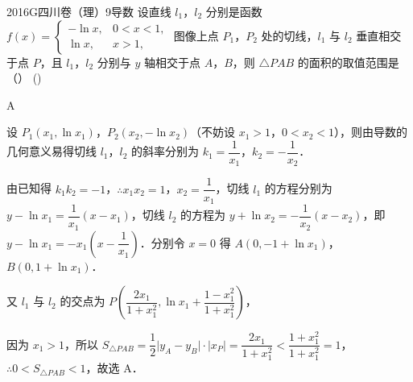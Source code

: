 
\begin{problem}{2016}{G}{四川卷（理）}{9}{导数}
设直线 $ l_1 $，$ l_2 $ 分别是函数 $ f(x)=\begin{cases} -\ln x, & 0<x<1, \\ \ln x, & x>1, \end{cases} $ 图像上点 $ P_1 $，$ P_2 $ 处的切线，$ l_1 $ 与 $ l_2 $ 垂直相交于点 $ P $，且 $ l_1 $，$ l_2 $ 分别与 $ y $ 轴相交于点 $ A $，$ B $，则 $ \triangle PAB $ 的面积的取值范围是 （\hspace{1cm}） (\hspace{1cm})
\begin{choices}
\end{choices}
\end{problem}

\begin{answer}
A
\end{answer}

\begin{solutions}
设 $ P_1(x_1,\ln x_1) $，$ P_2(x_2,-\ln x_2) $（不妨设 $ x_1>1 $，$ 0<x_2<1 $），则由导数的几何意义易得切线 $ l_1 $，$ l_2 $ 的斜率分别为 $ k_1=\dfrac{1}{x_1} $，$ k_2=-\dfrac{1}{x_2} $．

由已知得 $ k_1k_2=-1 $，$ \therefore x_1x_2=1 $，$ x_2=\dfrac{1}{x_1} $，切线 $ l_1 $ 的方程分别为 $ y-\ln x_1=\dfrac{1}{x_1}(x-x_1) $，切线 $ l_2 $ 的方程为 $ y+\ln x_2=-\dfrac{1}{x_2}(x-x_2) $，即 $ y-\ln x_1=-x_1\left(x-\dfrac{1}{x_1}\right) $．分别令 $ x=0 $ 得 $ A(0,-1+\ln x_1) $，$ B(0,1+\ln x_1) $．

又 $ l_1 $ 与 $ l_2 $ 的交点为 $ P\left(\dfrac{2x_1}{1+x_1^2},\ln x_1+\dfrac{1-x_1^2}{1+x_1^2}\right) $，

因为 $ x_1>1 $，所以 $ S_{\triangle PAB}=\dfrac{1}{2}\bigl|y_A-y_B\bigr|\cdot\bigl|x_P\bigr|=\dfrac{2x_1}{1+x_1^2}<\dfrac{1+x_1^2}{1+x_1^2}=1 $，$ \therefore 0<S_{\triangle PAB}<1 $，故选 A．
\end{solutions}